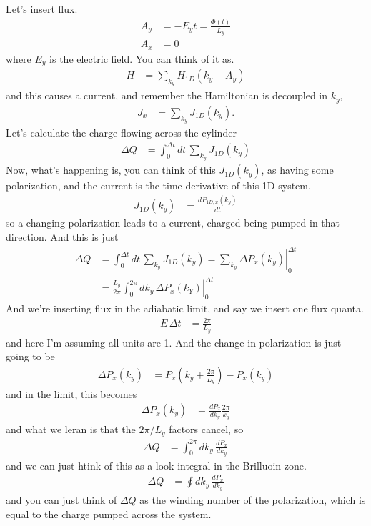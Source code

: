 Let's insert flux.
\begin{align}
    A_y &= - E_y t = \frac{\Phi(t)}{L_y}\\
    A_x &= 0
\end{align}
where $E_y$ is the electric field.
You can think of it as.
\begin{align}
    H &= \sum_{k_y} H_{1D}\left( k_y + A_y \right)
\end{align}
and this causes a current,
and remember the Hamiltonian is decoupled in $k_y$,
\begin{align}
    J_x &=
    \sum_{k_y} J_{1D}(k_y).
\end{align}
Let's calculate the charge flowing across the cylinder
\begin{align}
    \Delta Q &=
    \int_{0}^{\Delta t} dt\,
    \sum_{k_y} J_{1D}(k_y)
\end{align}
Now,
what's happening is,
you can think of this $J_{1D}(k_y)$,
as having some polarization,
and the current is the time derivative of this 1D system.
\begin{align}
    J_{1D}(k_y) &=
    \frac{d P_{1D, x}(k_y)}{dt}
\end{align}
so a changing polarization leads to a current,
charged being pumped in that direction.
And this is just
\begin{align}
    \Delta Q &=
    \int_{0}^{\Delta t} dt\,
    \sum_{k_y} J_{1D}(k_y)
    =
    \left.\sum_{k_y} \Delta P_x (k_y)\right|_{0}^{\Delta t}\\
    &=
    \left.\frac{L_y}{2\pi} \int_{0}^{2\pi} dk_y\,
    \Delta P_x(k_Y)\right|_{0}^{\Delta t}
\end{align}
And we're inserting flux in the adiabatic limit,
and say we insert one flux quanta.
\begin{align}
    E\, \Delta t &=
    \frac{2\pi}{L_y}
\end{align}
and here
I'm assuming all units are 1.
And the change in polarization is just going to be
\begin{align}
    \Delta P_x (k_y) &=
    P_x\left( k_y + \frac{2\pi}{L_y} \right)
    - P_x(k_y)
\end{align}
and in the limit,
this becomes
\begin{align}
    \Delta P_x (k_y) &=
    \frac{dP_x}{dk_y} \frac{2\pi}{k_y}
\end{align}
and what we leran is that the $2\pi/L_y$ factors cancel, so
\begin{align}
    \Delta Q &=
    \int_{0}^{2\pi} dk_y\,
    \frac{dP_x}{d k_y}
\end{align}
and we can just htink of this as a look integral in the Brilluoin zone.
\begin{align}
    \Delta Q &=
    \oint dk_y\,
    \frac{dP_x}{d k_y}
\end{align}
and you can just think of $\Delta Q$
as the winding number of the polarization,
which is equal to the charge pumped across the system.

